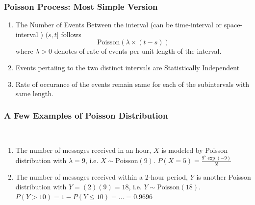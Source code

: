 \documentclass[compress]{beamer}
\begin{document}
\begin{frame}\frametitle{Poisson Process: Most Simple Version
}

\begin{enumerate}
\item The Number of Events Between the interval (can be time-interval or space-interval )  $(s, t]$ follows $$ \text{Poisson}(\lambda\times (t-s))$$
where $\lambda>0$ denotes of rate of events per unit length of the interval. 
\item Events pertaiing to the two distinct intervals are Statistically Independent
\item Rate of occurance of the events remain same for each of the subintervals with same length. 
\end{enumerate}

\end{frame}


\begin{frame}\frametitle{A Few Examples of Poisson Distribution }
\vspace{-.1in}
\\


\vspace{.5in}
{\tiny 
\begin{enumerate}
\item The number of messages received in an hour, $X$ is modeled by
Poisson distribution with $\lambda =  9$, i.e.  $X\sim \text{Poisson}(9)$.
$P(X=5)= \frac{9^5 \exp(-9)}{5!}$
\item The number of messages received within a 2-hour period, $Y$ is
another Poisson distribution with  $Y= (2)(9) =18$, i.e. $Y\sim  \text{Poisson}(18)$.
$P(Y > 10) =1- P(Y\leq 10 )= ...= 0.9696$
\end{enumerate}

}

\end{frame}
\end{document}
